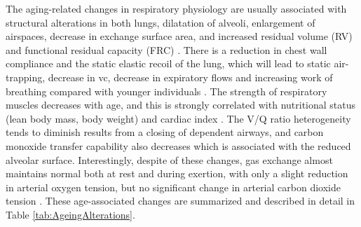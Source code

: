 The aging-related changes in respiratory physiology are usually associated with structural alterations in both lungs, dilatation of alveoli, enlargement of airspaces, decrease in exchange surface area, and increased residual volume (RV) and functional residual capacity (FRC) \citep{sprung2006age,lalley2013aging}. There is a reduction in chest wall compliance and the static elastic recoil of the lung, which will lead to static air-trapping, decrease in \gls{vc}, decrease in expiratory flows and increasing work of breathing compared with younger individuals \citep{sprung2006age}. The strength of respiratory muscles decreases with age, and this is strongly correlated with nutritional status (lean body mass, body weight) and cardiac index \citep{janssens1999physiological}. The V/Q ratio heterogeneity tends to diminish results from a closing of dependent airways, and carbon monoxide transfer capability also decreases which is associated with the reduced alveolar surface. Interestingly, despite of these changes, gas exchange almost maintains normal both at rest and during exertion, with only a slight reduction in arterial oxygen tension, but no significant change in arterial carbon dioxide tension \citep{janssens1999physiological}. These age-associated changes are summarized and described in detail in Table \ref{tab:AgeingAlterations}.

